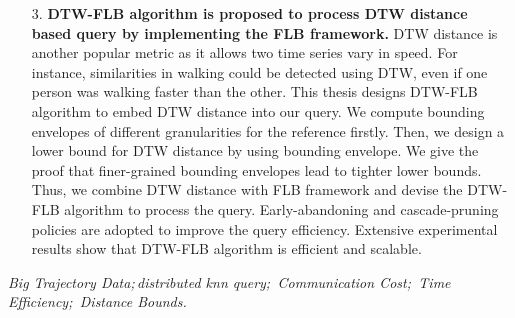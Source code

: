 \begin{itemize}
\item[3.] \textbf{ 	DTW-FLB algorithm is proposed to process DTW  distance based query by implementing the FLB framework.} 
DTW distance is another popular metric as it allows two time series vary in speed. For instance, similarities  in walking could be detected using DTW, even if one person was walking faster than the other. This thesis designs DTW-FLB algorithm to embed DTW distance into our query.
We compute  bounding envelopes of different granularities for the reference firstly. Then, we design a lower bound for DTW distance by using bounding envelope. We give the proof that  finer-grained bounding envelopes lead to tighter lower bounds. Thus, we combine DTW distance with FLB framework and devise the DTW-FLB algorithm to process the query. Early-abandoning and cascade-pruning policies are  adopted to improve the query efficiency. Extensive experimental results  show that DTW-FLB  algorithm is efficient and scalable.

\end{itemize}

\hspace{-0.5cm}
{} \textit{Big Trajectory Data;\,distributed knn query;\, Communication Cost;\, Time Efficiency;\, Distance Bounds.
}
































